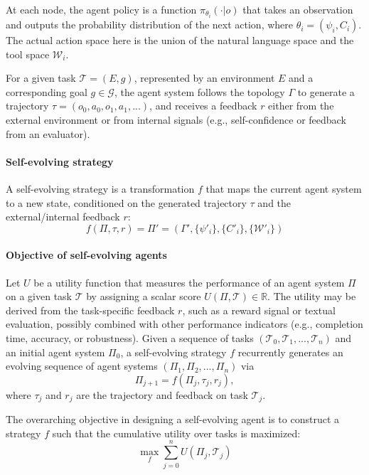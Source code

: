 \documentclass[10pt]{article} %
\begin{document}
At each node, the agent policy is a function $\pi_{\theta_i}(\cdot|o)$ that takes an observation and outputs the probability distribution of the next action, where $\theta_i=(\psi_i, C_i)$. The actual action space here is the union of the natural language space and the tool space $\mathcal{W}_i$.

For a given task $\mathcal{T}=(E, g)$, represented by an environment $E$ and a corresponding goal $g\in \mathcal{G}$, the agent system follows the topology $\Gamma$ to generate a trajectory $\tau=(o_0, a_0, o_1, a_1,...)$, and receives a feedback $r$ either from the external environment or from internal signals (e.g., self-confidence or feedback from an evaluator).

\paragraph{Self-evolving strategy} A self-evolving strategy is a transformation $f$ that maps the current agent system to a new state, conditioned on the generated trajectory $\tau$ and the external/internal feedback $r$:  
\begin{equation}
    f(\Pi, \tau, r)=\Pi'=(\Gamma',\{\psi'_i\}, \{C'_i\}, \{\mathcal{W}'_i\})
\end{equation}

\paragraph{Objective of self-evolving agents} 
Let $U$ be a utility function that measures the performance of an agent system $\Pi$ on a given task $\mathcal{T}$ by assigning a scalar score $U(\Pi, \mathcal{T}) \in \mathbb{R}$. The utility may be derived from the task-specific feedback $r$, such as a reward signal or textual evaluation, possibly combined with other performance indicators (e.g., completion time, accuracy, or robustness). Given a sequence of tasks $(\mathcal{T}_0, \mathcal{T}_1, ..., \mathcal{T}_n)$ and an initial agent system $\Pi_0$, a self-evolving strategy $f$ recurrently generates an evolving sequence of agent systems $(\Pi_1, \Pi_2, ..., \Pi_n)$ via
\begin{equation}
    \Pi_{j+1} = f(\Pi_j, \tau_j, r_j),
\end{equation}
where $\tau_j$ and $r_j$ are the trajectory and feedback on task $\mathcal{T}_j$. 

The overarching objective in designing a self-evolving agent is to construct a strategy $f$ such that the cumulative utility over tasks is maximized:
\begin{equation}
    \max_f \sum_{j=0}^n U(\Pi_j, \mathcal{T}_j)
\end{equation}
\end{document}

